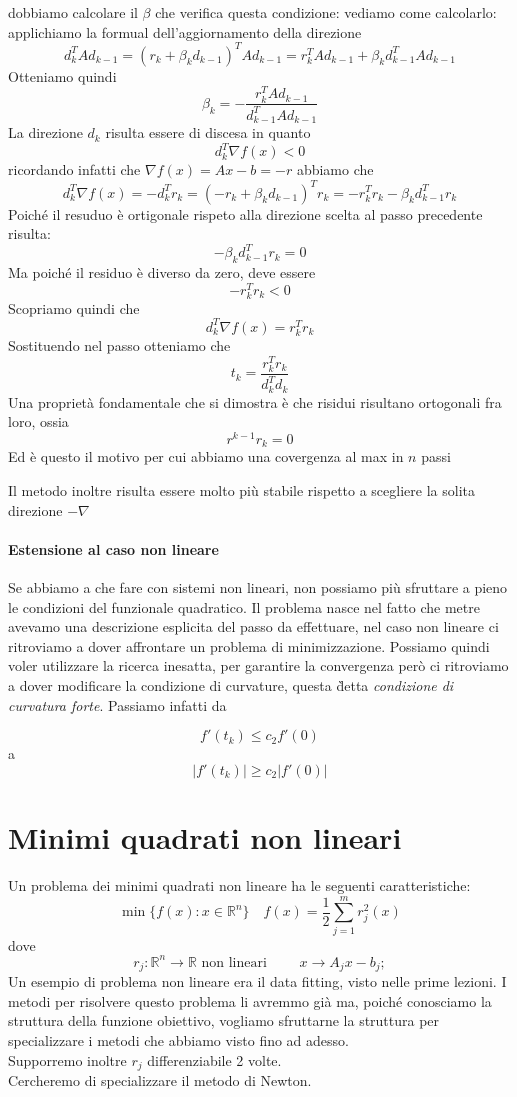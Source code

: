 \documentclass[a4paper,10pt]{article}
\begin{document}
dobbiamo calcolare il $\beta$ che verifica questa condizione:
vediamo come calcolarlo: applichiamo la formual dell'aggiornamento della
direzione
$$ d_k^{T} A d_{k-1} = (r_k + \beta_k d_{k-1})^{T} A d_{k-1} = 
r_k^{T} A d_{k-1} + \beta_k d_{k-1}^{T} A d_{k-1} $$
Otteniamo quindi  
$$ \beta_k = - \frac{r_k^{T} A d_{k-1}}{d_{k-1}^{T} A d_{k-1}}$$
La direzione $d_k$ risulta essere di discesa in quanto
$$ d_k^{T} \nabla f(x) < 0$$
ricordando infatti che $\nabla f(x) = Ax-b = -r$
abbiamo che
$$ d_k^{T} \nabla f(x) = -d_k^{T}r_k=
(-r_k + \beta_k d_{k-1})^{T}r_k = -r_k^{T}r_k  - \beta_k d_{k-1}^{T}r_k $$
Poich\'e il resuduo \`e ortigonale rispeto alla direzione scelta al passo precedente risulta:
$$  - \beta_k d_{k-1}^{T}r_k = 0 $$
Ma poich\'e il residuo \`e diverso da zero,  deve essere
$$ -r_k^{T} r_k < 0$$ 
Scopriamo quindi che
$$d_k^{T} \nabla f(x) = r_k^{T} r_k$$
Sostituendo nel passo otteniamo
che
$$ t_k = \frac{r_k^{T}r_k}{d_k^{T}d_k}$$
Una propriet\`a fondamentale che si dimostra \`e che risidui risultano ortogonali fra loro, ossia
$$ r^{k-1}r_k = 0 $$
Ed \`e questo il motivo per cui abbiamo una covergenza al max in $n$ passi

Il metodo inoltre risulta essere molto pi\`u stabile 
rispetto a scegliere la solita direzione $-\nabla$
\paragraph{Estensione al caso non lineare}
Se abbiamo a che fare con sistemi non lineari, non
possiamo pi\`u sfruttare a pieno le condizioni del funzionale quadratico.
Il problema nasce nel fatto che metre avevamo una descrizione 
esplicita del passo da effettuare, nel caso non lineare ci ritroviamo
a dover affrontare un problema di minimizzazione.
Possiamo quindi voler utilizzare la ricerca inesatta, per garantire
la convergenza per\`o ci ritroviamo a dover modificare la condizione
di curvature, questa \` detta \emph{condizione di curvatura forte}.
Passiamo infatti da

$$ f'(t_k) \leq c_2 f'(0) $$
a
$$ |f'(t_k)|  \geq c_2 |f'(0)| $$

\section{Minimi quadrati non lineari}
Un problema dei minimi quadrati non lineare ha le seguenti caratteristiche:
$$ \min \{f(x) : x \in \mathbb{R}^{n} \} \quad
f(x) = \frac{1}{2} \displaystyle \sum_{j=1}^{m} r_j^{2}(x) $$
dove
$$r_j: \mathbb{R}^{n} \rightarrow \mathbb{R} \text{ non lineari } 
\qquad  x \rightarrow A_jx-b_j;$$
Un esempio di problema non lineare era il data fitting, visto nelle
prime lezioni. I metodi per risolvere questo problema li avremmo gi\`a ma,
poich\'e conosciamo la struttura della funzione obiettivo,
vogliamo sfruttarne la struttura  per specializzare i metodi che
 abbiamo visto fino ad adesso. \\
Supporremo inoltre $r_j$ differenziabile 2 volte.\\
Cercheremo di specializzare il metodo di Newton. \\
\end{document}
